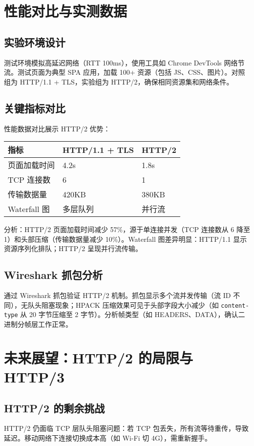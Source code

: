 \chapter{性能对比与实测数据}
\section{实验环境设计}
测试环境模拟高延迟网络（RTT 100ms），使用工具如 Chrome DevTools 网络节流。测试页面为典型 SPA 应用，加载 100+ 资源（包括 JS、CSS、图片）。对照组为 HTTP/1.1 + TLS，实验组为 HTTP/2，确保相同资源集和网络条件。\par
\section{关键指标对比}
性能数据对比展示 HTTP/2 优势：\par
\begin{table}[H]
\centering
\begin{tabular}{|l|l|l|}
\hline
指标 & HTTP/1.1 + TLS & HTTP/2 \\
\hline
页面加载时间 & 4.2s & 1.8s \\
\hline
TCP 连接数 & 6 & 1 \\
\hline
传输数据量 & 420KB & 380KB \\
\hline
Waterfall 图 & 多层队列 & 并行流 \\
\hline
\end{tabular}
\end{table}
分析：HTTP/2 页面加载时间减少 57\%{}，源于单连接并发（TCP 连接数从 6 降至 1）和头部压缩（传输数据量减少 10\%{}）。Waterfall 图差异明显：HTTP/1.1 显示资源序列化排队；HTTP/2 呈现并行流传输。\par
\section{Wireshark 抓包分析}
通过 Wireshark 抓包验证 HTTP/2 机制。抓包显示多个流并发传输（流 ID 不同），无队头阻塞现象；HPACK 压缩效果可见于头部字段大小减少（如 \texttt{content-type} 从 20 字节压缩至 2 字节）。分析帧类型（如 HEADERS、DATA），确认二进制分帧层工作正常。\par
\chapter{未来展望：HTTP/2 的局限与 HTTP/3}
\section{HTTP/2 的剩余挑战}
HTTP/2 仍面临 TCP 层队头阻塞问题：若 TCP 包丢失，所有流等待重传，导致延迟。移动网络下连接切换成本高（如 Wi-Fi 切 4G），需重新握手。\par
